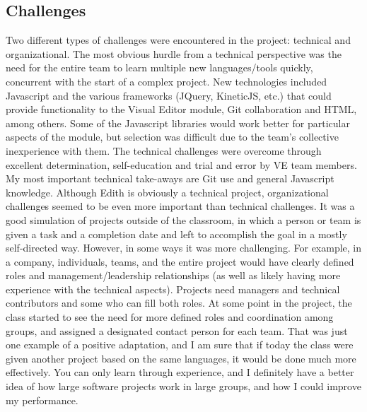 \documentclass[a4paper]{article}
\begin{document}
	\subsection{Challenges}
	Two different types of challenges were encountered in the project: technical and organizational.  The most obvious hurdle from a technical perspective was the need for the entire team to learn multiple new languages/tools quickly, concurrent with the start of a complex project.  New technologies included Javascript and the various frameworks (JQuery, KineticJS, etc.) that could provide functionality to the Visual Editor module, Git collaboration and HTML, among others.  Some of the Javascript libraries would work better for particular aspects of the module, but selection was difficult due to the team's collective inexperience with them.  The technical challenges were overcome through excellent determination, self-education and trial and error by VE team members.  My most important technical take-aways are Git use and general Javascript knowledge.
	Although Edith is obviously a technical project, organizational challenges seemed to be even more important than technical challenges.  It was a good simulation of projects outside of the classroom, in which a person or team is given a task and a completion date and left to accomplish the goal in a mostly self-directed way.  However, in some ways it was more challenging.  For example, in a company, individuals, teams, and the entire project would have clearly defined roles and management/leadership relationships (as well as likely having more experience with the technical aspects).  Projects need managers and technical contributors and some who can fill both roles.  At some point in the project, the class started to see the need for more defined roles and coordination among groups, and assigned a designated contact person for each team.  That was just one example of a positive adaptation, and I am sure that if today the class were given another project based on the same languages, it would be done much more effectively.  You can only learn through experience, and I definitely have a better idea of how large software projects work in large groups, and how I could improve my performance.
	                
	       
	
\end{document}
